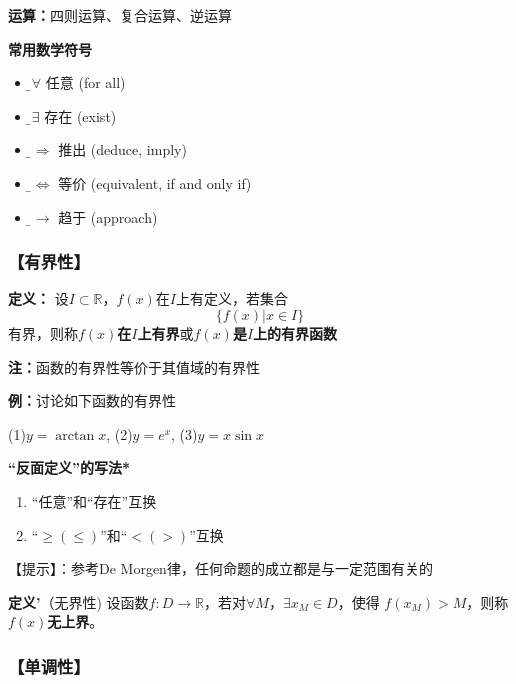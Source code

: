 {\bf 运算：}四则运算、复合运算、逆运算	
	
\begin{shaded}
{\bf 常用数学符号}
	\begin{itemize}
	  \item {\b$\bm{\forall}$} \quad 任意 (for all)
	  \item {\b$\bm{\exists}$} \quad 存在 (exist)
	  \item {\b$\bm{\Rightarrow}$} \quad 推出 (deduce, imply)
	  \item {\b$\bm{\Leftrightarrow}$} \quad 等价 (equivalent, if and only if)
	  \item {\b$\bm{\to}$} \quad 趋于 (approach)
	\end{itemize}
\end{shaded}

\subsubsection{【有界性】}			

{{\bf 定义：}}
	设$I\subset\mathbb{R}$，$f(x)$在$I$上有定义，若集合
	$$\{f(x)|x\in I\}$$
	有界，则称{\bf $f(x)$在$I$上有界}或{\bf $f(x)$是$I$上的有界函数}
		
	{\bf 注：}函数的有界性等价于其值域的有界性

	{{\bf 例：}讨论如下函数的有界性}
	
		\quad(1)\;$y=\arctan x$,\hspace{2em} (2)\;$y=e^x$,\hspace{2em}
		(3)\;$y=x\sin x$
		
\begin{shaded}
	{\bf “反面定义”的写法*}
	\begin{enumerate}
	  \item {“任意”和“存在”互换}
	  \item {“$\geq(\leq)$”和“$<(>)$”互换}
	\end{enumerate}
	
	【提示】：参考De Morgen律，任何命题的成立都是与一定范围有关的
	
	{\bf 定义'}（无界性)
		设函数$f:D\to\mathbb{R}$，若对$\forall M$，$\exists x_M\in D$，使得
		$f(x_M)>M$，则称{\bf $f(x)$无上界}。

\end{shaded}		

\subsubsection{【单调性】}

